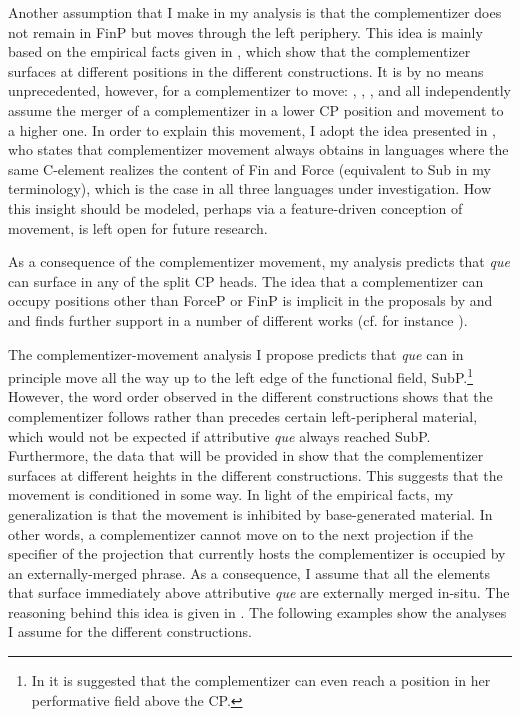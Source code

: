 Another assumption that I make in my analysis is that the complementizer does not remain in FinP but moves through the left periphery. This idea is mainly based on the empirical facts given in , which show that the complementizer surfaces at different positions in the different constructions. It is by no means unprecedented, however, for a complementizer to move: \citet{Rizzi1997}, \citet{Poletto2000}, \citet{Roberts2001}, \citet{Ledgeway2005} and  \citet{Belletti2009, Belletti2013} all independently assume the  merger of a complementizer in a lower CP position and movement to a higher one. 
In order to explain this movement, I adopt the idea presented in \citet{Belletti2009, Belletti2013}, who states that complementizer movement always obtains in languages where the same C-element realizes the content of Fin and Force (equivalent to Sub in my terminology), which is the case in all three languages under investigation. How this insight should be  modeled, perhaps  via  a feature-driven conception of movement, is left open for future research.  
  	

As a consequence of the complementizer movement, my analysis predicts that \emph{que} can surface in any of the split CP heads. The idea that a complementizer can occupy positions other than ForceP or FinP is  implicit in the proposals by \citet{Haegeman2004, Haegeman2006} and \citet{VillaGarcia2015}  and finds further support in a number of different works (cf. for instance \citealt{Roussou2000,Roussou2010, Gutierrez-Rexach2001, Brovetto2002, Rodriguez-Ramalle2003, DemonteSoriano2009, Ledgeway2005, Villa-Garci2012,Villa-Garci2012a, VillaGarcia2015, Corr2016}). 

The complementizer-movement analysis I propose predicts that \emph{que} can in principle move all the way up to the left edge of the functional field, SubP.\footnote{In \citet{Corr2016} it is suggested that the complementizer can even reach a position in her performative field above the CP.} However, the word order observed in the different constructions shows that the complementizer follows rather than precedes certain left-peripheral material, which would not be expected if attributive \emph{que} always reached SubP. Furthermore, the data that will be provided in  show that  the complementizer surfaces at different heights in the different constructions. This suggests that the movement is conditioned in some way. In light of the empirical facts, my generalization is that the movement is inhibited by base-generated material. In other words, a complementizer cannot move on to the next projection if the specifier of the projection that currently hosts the complementizer is occupied by an externally-merged phrase. As a consequence, I assume that all the elements that surface immediately above attributive \emph{que} are externally merged in-situ. The reasoning behind this idea is given  in . The following examples show the analyses I assume for the different constructions.  

